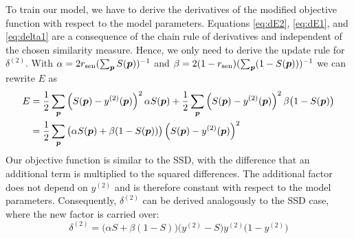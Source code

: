 To train our model, we have to derive the derivatives of the modified objective
function with respect to the model parameters. Equations \eqref{eq:dE2},
\eqref{eq:dE1}, and \eqref{eq:delta1} are a consequence of the chain rule of
derivatives and independent of the chosen similarity measure. Hence, we only
need to derive the update rule for $\delta^{(2)}$. With $\alpha = 2r_\text{sen}
(\sum_{\vect{p}}S(\vect{p}))^{-1}$ and $\beta = 2(1 -
r_\text{sen})(\sum_{\vect{p}}(1 - S(\vect{p})))^{-1}$ we can rewrite $E$ as
\begin{align} 
E &= \frac{1}{2}\sum_{\vect{p}} \left(S(\vect{p}) - y^{(2)}(\vect{p})\right)^2
\alpha S(\vect{p}) +
\frac{1}{2}\sum_{\vect{p}} \left(S(\vect{p}) - y^{(2)}(\vect{p})\right)^2
\beta\big(1 - S(\vect{p})\big) \\
 &= \frac{1}{2}\sum_{\vect{p}} \big(\alpha S(\vect{p}) +
 \beta(1 - S(\vect{p}))\big)
 \left(S(\vect{p}) - y^{(2)}(\vect{p})\right)^2
\end{align}
Our objective function is similar to the SSD, with the difference that an
additional term is multiplied to the squared differences. The additional factor
does not depend on $y^{(2)}$ and is therefore constant with respect to the
model parameters. Consequently, $\delta^{(2)}$ can be derived analogously to the
SSD case, where the new factor is carried over:
\begin{equation} 
\delta^{(2)} = \big(\alpha S + \beta (1 - S)\big)\big(y^{(2)} - S\big) y^{(2)}
\big(1 - y^{(2)}\big)
\end{equation}
